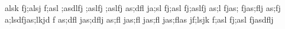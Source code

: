 alsk fj;alsj f;asl ;asdlfj ;aslfj ;aslfj as;dfl
ja;sl fj;asl fj;aslfj as;l fjas; fjas;flj as;fj  
a;lsdfjas;lkjd f
as;dfl jas;dflj as;fl jas;fl jas;fl jas;flas
jf;lsjk f;asl fj;asl fjasdflj
